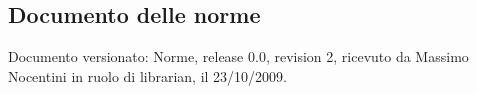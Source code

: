 \subsection{Documento delle norme}
Documento versionato: Norme, release 0.0, revision 2, ricevuto da Massimo Nocentini in ruolo di librarian, il 23/10/2009. 
